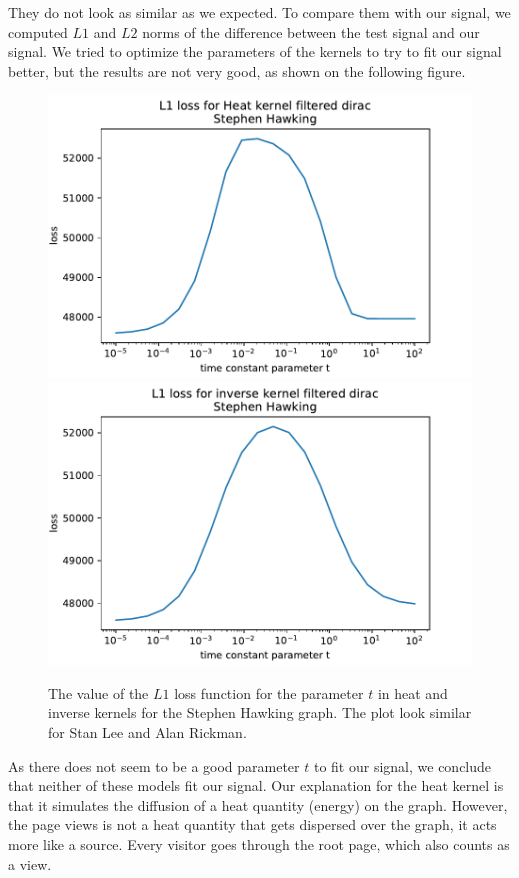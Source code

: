 \documentclass[conference]{IEEEtran}
\begin{document}
They do not look as similar as we expected. To compare them with our signal, we computed $L1$ and $L2$ norms of the difference between the test signal and our signal.  We tried to optimize the parameters of the kernels to try to fit our signal better, but the results are not very good, as shown on the following figure. 

\begin{figure}[!htb]
\includegraphics[width=\linewidth]{heat_loss.pdf}
\includegraphics[width=\linewidth]{inverse_loss.pdf}
\caption{The value of the $L1$ loss function for the parameter $t$ in heat and inverse kernels for the Stephen Hawking graph. The plot look similar for Stan Lee and Alan Rickman. } 
\end{figure}

As there does not seem to be a good parameter $t$ to fit our signal, we conclude that neither of these models fit our signal. Our explanation for the heat kernel is that it simulates the diffusion of a heat quantity (energy) on the graph. However, the page views is not a heat quantity that gets dispersed over the graph, it acts more like a source. Every visitor goes through the root page, which also counts as a view.
\end{document}
